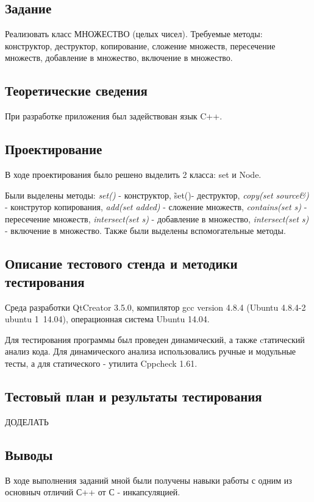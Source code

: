 \documentclass[12pt,a4paper]{report}
\begin{document}
\subsection{Задание}
\hspace{\parindent}
Реализовать класс МНОЖЕСТВО (целых чисел). Требуемые методы: конструктор, деструктор, копирование, сложение множеств, пересечение множеств, добавление в множество, включение в множество.
\subsection{Теоретические сведения}
\hspace{\parindent}
При разработке приложения был задействован язык C++. 

\subsection{Проектирование}
\hspace{\parindent}
В ходе проектирования было решено выделить 2 класса: set и Node.

\hspace{\parindent}
Были выделены методы: \textit{set()} - конструктор, \~set()- деструктор, \textit{copy(set source\&)} - конструтор копирования, \textit{add(set added)} - сложение множеств, \textit{contains(set s)} - пересечение множеств, \textit{intersect(set s)} - добавление в множество, \textit{intersect(set s)} - включение в множество.
Также были выделены вспомогательные методы.


\subsection{Описание тестового стенда и методики тестирования}
\hspace{\parindent}
Среда разработки QtCreator 3.5.0, компилятор gcc version 4.8.4 (Ubuntu 4.8.4-2 ubuntu 1~14.04), операционная система Ubuntu 14.04. 

Для тестирования программы был проведен динамический, а также cтатический анализ кода. Для динамического анализа использовались ручные и модульные тесты, а для статического - утилита Cppcheck 1.61.
\subsection{Тестовый план и результаты тестирования}
ДОДЕЛАТЬ
\subsection{Выводы}
\hspace{\parindent}
В ходе выполнения заданий мной были получены навыки работы с одним из основныч отличий С++ от С - инкапсуляцией.
\end{document}
